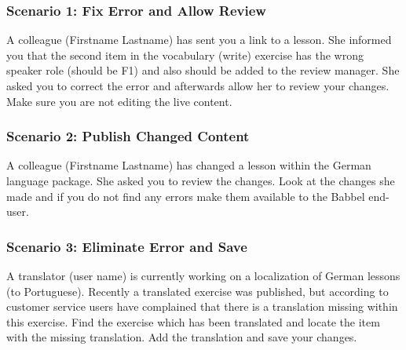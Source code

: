 \subsubsection{Scenario 1: Fix Error and Allow Review}
A colleague (Firstname Lastname) has sent you a link to a lesson. She informed you that the second item in the vocabulary (write) exercise has the wrong speaker role (should be F1) and also should be added to the review manager. She asked you to correct the error and afterwards allow her to review your changes. Make sure you are not editing the live content.


\subsubsection{Scenario 2: Publish Changed Content}
A colleague (Firstname Lastname) has changed a lesson within the German language package. She asked you to review the changes. Look at the changes she made and if you do not find any errors make them available to the Babbel end-user.


\subsubsection{Scenario 3: Eliminate Error and Save}
A translator (user name) is currently working on a localization of German lessons (to Portuguese). Recently a translated exercise was published, but according to customer service users have complained that there is a translation missing within this exercise. Find the exercise which has been translated and locate the item with the missing translation. Add the translation and save your changes.

